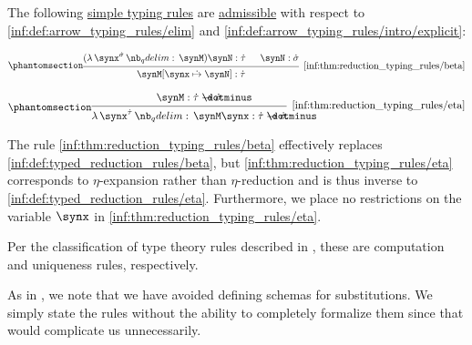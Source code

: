 \begin{proposition}\label{thm:reduction_typing_rules}
  The following \hyperref[def:simple_typing_rule]{simple typing rules} are \hyperref[con:inference_rule_admissibility]{admissible} with respect to \ref{inf:def:arrow_typing_rules/elim} and \ref{inf:def:arrow_typing_rules/intro/explicit}:
  \begin{paracol}{2}
    \begin{leftcolumn}
      \begin{equation*}\taglabel[\ensuremath{ \rightarrow_\beta }]{inf:thm:reduction_typing_rules/beta}
        \begin{prooftree}
          \hypo{ (\qabs {\synx^{\syn\sigma}} \synM) \synN: \syn\tau }
          \hypo{ \synN: \syn\sigma }
          \infer2[\ref{inf:thm:reduction_typing_rules/beta}]{ \synM[\synx \synsubst \synN]: \syn\tau }.
        \end{prooftree}
      \end{equation*}
    \end{leftcolumn}

    \begin{rightcolumn}
      \begin{equation*}\taglabel[\ensuremath{ \leftarrow_\eta }]{inf:thm:reduction_typing_rules/eta}
        \begin{prooftree}
          \hypo{ \synM: \syn\tau \synimplies \syn\sigma }
          \infer1[\ref{inf:thm:reduction_typing_rules/eta}]{ \qabs {\synx^{\syn\tau}} \synM \synx: \syn\tau \synimplies \syn\sigma }.
        \end{prooftree}
      \end{equation*}
    \end{rightcolumn}
  \end{paracol}
\end{proposition}
\begin{comments}
  \item The rule \ref{inf:thm:reduction_typing_rules/beta} effectively replaces \ref{inf:def:typed_reduction_rules/beta}, but \ref{inf:thm:reduction_typing_rules/eta} corresponds to \( \eta \)-expansion rather than \( \eta \)-reduction and is thus inverse to \ref{inf:def:typed_reduction_rules/eta}. Furthermore, we place no restrictions on the variable \( \synx \) in \ref{inf:thm:reduction_typing_rules/eta}.

  \item Per the classification of type theory rules described in , these are computation and uniqueness rules, respectively.

  \item As in , we note that we have avoided defining schemas for substitutions. We simply state the rules without the ability to completely formalize them since that would complicate us unnecessarily.
\end{comments}
